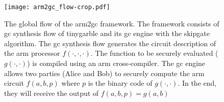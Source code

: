 \begin{figure}
\centering
\texttt{[image: arm2gc\_flow-crop.pdf]}
\caption{The global flow of the \gls{arm2gc} framework.
The framework consists of \acrshort{gc} synthesis flow of \gls{tinygarble} and its \acrshort{gc} engine with the \gls{skipgate} algorithm.
The \acrshort{gc} synthesis flow generates the circuit description of the \gls{arm} processor $f(\cdot,\cdot,\cdot)$.
The function to be securely evaluated ($g(\cdot,\cdot)$) is compiled using an \gls{arm} cross-compiler.
The \acrshort{gc} engine allows two parties (Alice and Bob) to securely compute the \gls{arm} circuit $f(a,b,p)$ where $p$ is the binary code of $g(\cdot,\cdot)$.
In the end, they will receive the output of $f(a,b,p) = g(a,b)$
}
\label{fig:arm2gc-globalflow}
\end{figure}

